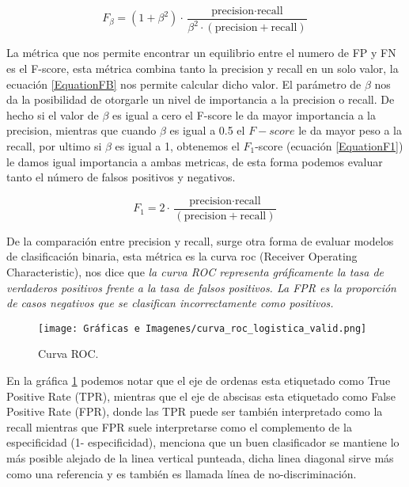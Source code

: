 \begin{equation}
	F_\beta=(1+\beta^2)\cdot \frac{\textrm{precision}\cdot \textrm{recall}}{\beta^2\cdot(\textrm{precision}+\textrm{recall})} 
	\label{EquationFB}
\end{equation}

La métrica que nos permite encontrar un equilibrio entre el numero de FP y FN es el F-score, esta métrica combina tanto la precision y recall en un solo valor, la ecuación \ref{EquationFB} nos permite calcular dicho valor. El parámetro de $\beta$ nos da la posibilidad de otorgarle un nivel de importancia a la precision o recall. De hecho si el valor de $\beta$ es igual a cero el F-score le da mayor importancia a la precision, mientras que cuando $\beta$ es igual a 0.5 el $F-score$ le da mayor peso a la recall, por ultimo si $\beta$ es igual a 1, obtenemos el $F_1$-score (ecuación \ref{EquationF1}) le damos igual importancia a ambas metricas, de esta forma podemos evaluar tanto el número de falsos positivos y negativos.


\begin{equation}
	F_1=2\cdot \frac{\textrm{precision}\cdot \textrm{recall}}{(\textrm{precision}+\textrm{recall})} 
	\label{EquationF1}
\end{equation}


De la comparación entre precision y recall, surge otra forma de evaluar modelos de clasificación binaria, esta métrica es la curva roc (Receiver Operating Characteristic), \citet[p. 91]{2017Géron} nos dice que \textit{la curva ROC representa gráficamente la tasa de verdaderos positivos frente a la tasa de falsos positivos. La FPR es la proporción de casos negativos que se clasifican incorrectamente como positivos.} 

\begin{figure}[h]
	\centering
	\texttt{[image: Gráficas e Imagenes/curva\_roc\_logistica\_valid.png]}
	\caption{Curva ROC.}
	\label{fig:CurvaRoc}
\end{figure}

En la gráfica \ref{fig:CurvaRoc} podemos notar que el eje de ordenas esta etiquetado como True Positive Rate (TPR), mientras que el eje de abscisas esta etiquetado como False Positive Rate (FPR), donde las TPR puede ser también interpretado como la recall mientras que FPR suele interpretarse como el complemento de la especificidad (1- especificidad), \citep{2017Géron} menciona que un buen clasificador se mantiene lo más posible alejado de la linea vertical punteada, dicha linea diagonal sirve más como una referencia y es también es llamada línea de no-discriminación.


